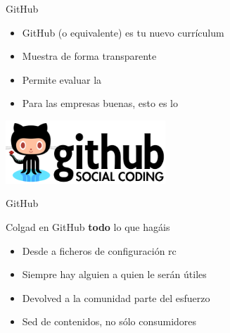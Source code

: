 \documentclass[14pt]{beamer}
\begin{document}
\begin{frame}{GitHub}
  \begin{itemize}
    \item GitHub (o equivalente) es tu nuevo currículum
    \item Muestra de forma transparente 
    \item Permite evaluar la 
    \item Para las empresas buenas, esto es lo 
  \end{itemize}

  \begin{center}
    \includegraphics[width=6cm]{pics/github-logo.png}
  \end{center}
\end{frame}

\begin{frame}{GitHub}

  \begin{block}{\scriptsize} \centering
    \Large Colgad en GitHub {\bf todo} lo que hagáis
  \end{block}

  \begin{itemize}
    \item Desde  a ficheros de configuración rc
    \item Siempre hay alguien a quien le serán útiles
    \item Devolved a la comunidad parte del esfuerzo
    \item Sed  de contenidos, no sólo consumidores
  \end{itemize}

\end{frame}
\end{document}
